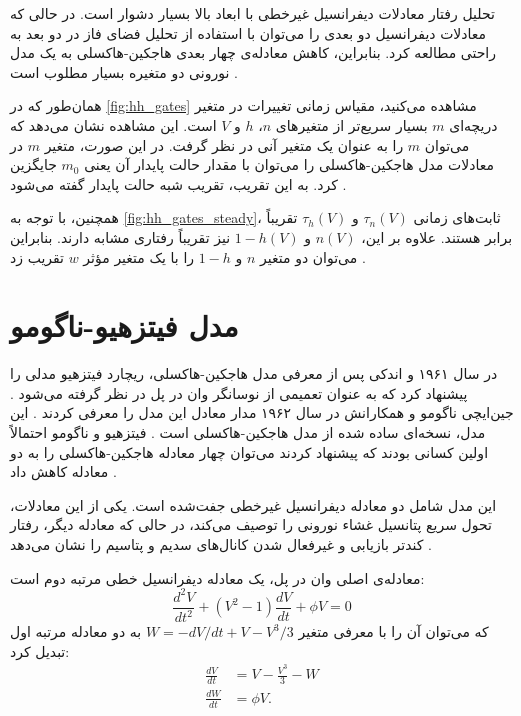 تحلیل رفتار معادلات دیفرانسیل غیرخطی با ابعاد بالا بسیار دشوار است.
در حالی که معادلات دیفرانسیل دو بعدی را می‌توان با استفاده از تحلیل فضای فاز در دو بعد به راحتی مطالعه کرد.
بنابراین، کاهش معادله‌ی چهار بعدی هاجکین-هاکسلی به یک مدل نورونی دو متغیره بسیار مطلوب است
\cite{gerstner2002}.

همان‌طور که در
\autoref{fig:hh_gates}
مشاهده می‌کنید، مقیاس زمانی تغییرات در متغیر دریچه‌ای
\( m \)
بسیار سریع‌تر از متغیرهای
\( n \)، \( h \) و \( V \)
است.
این مشاهده نشان می‌دهد که می‌توان
\( m \)
را به عنوان یک متغیر آنی در نظر گرفت.
در این صورت، متغیر
\( m \)
در معادلات مدل هاجکین-هاکسلی را می‌توان با مقدار حالت پایدار آن یعنی
\( m_{0} \)
جایگزین کرد.
به این تقریب، تقریب شبه حالت پایدار گفته می‌شود
\cite{gerstner2002}.

همچنین، با توجه به
\autoref{fig:hh_gates_steady}،
ثابت‌های زمانی
\( \tau_{n}(V) \) و \( \tau_{h}(V) \)
تقریباً برابر هستند.
علاوه بر این،
\( n(V) \) و \( 1 - h(V) \)
نیز تقریباً رفتاری مشابه دارند.
بنابراین می‌توان دو متغیر
\( n \) و \( 1 - h \)
را با یک متغیر مؤثر
\( w \)
تقریب زد
\cite{gerstner2002}.

\section{مدل فیتزهیو-ناگومو}
در سال ۱۹۶۱ و اندکی پس از معرفی مدل هاجکین-هاکسلی، ریچارد فیتزهیو مدلی را پیشنهاد کرد که به عنوان تعمیمی از نوسانگر وان در پل در نظر گرفته می‌شود
\cite{fitzhugh1961}.
جین‌ایچی ناگومو و همکارانش در سال ۱۹۶۲ مدار معادل این مدل را معرفی کردند
\cite{nagumo1962}.
این مدل، نسخه‌ای ساده شده از مدل هاجکین-هاکسلی است
\cite{sherwood2014}.
فیتزهیو و ناگومو احتمالاً اولین کسانی بودند که پیشنهاد کردند می‌توان چهار معادله هاجکین-هاکسلی را به دو معادله کاهش داد
\cite{gerstner2002}.

این مدل شامل دو معادله دیفرانسیل غیرخطی جفت‌شده است.
یکی از این معادلات، تحول سریع پتانسیل غشاء نورونی را توصیف می‌کند، در حالی که معادله دیگر، رفتار کندتر بازیابی و غیرفعال شدن کانال‌های سدیم و پتاسیم را نشان می‌دهد
\cite{sherwood2014}.

معادله‌ی اصلی وان در پل، یک معادله دیفرانسیل خطی مرتبه دوم است:
\begin{equation}
    \frac{d^2 V}{dt^2} + (V^2 - 1) \frac{dV}{dt} + \phi V = 0
\end{equation}
که می‌توان آن را با معرفی متغیر
\( W = -dV /dt + V - V^3 / 3 \)
به دو معادله مرتبه اول تبدیل کرد:
\begin{subequations}
    \begin{align}
        \frac{dV}{dt} & = V - \frac{V^3}{3} - W \\
        \frac{dW}{dt} & = \phi V.
    \end{align}
\end{subequations}

